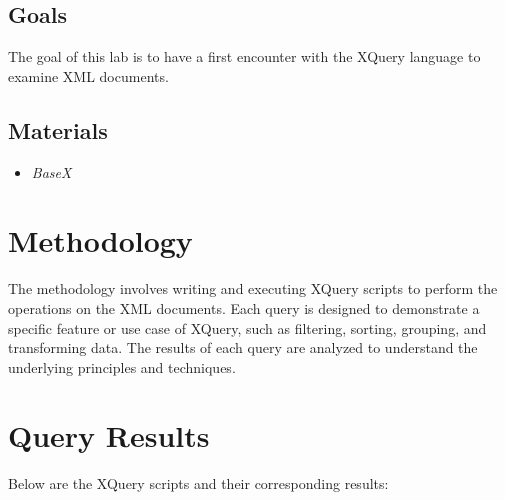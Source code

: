 \documentclass[twoside]{article}
\begin{document}
\subsection*{Goals}
The goal of this lab is to have a first encounter with the XQuery language to examine XML
documents.

\subsection*{Materials}
\begin{itemize}
\item \textit{BaseX}
\end{itemize}

\section{Methodology}
The methodology involves writing and executing XQuery scripts to perform the operations on the XML documents. Each query is designed to demonstrate a specific feature or use case of XQuery, such as filtering, sorting, grouping, and transforming data. The results of each query are analyzed to understand the underlying principles and techniques.

\section{Query Results}
Below are the XQuery scripts and their corresponding results:
\end{document}
